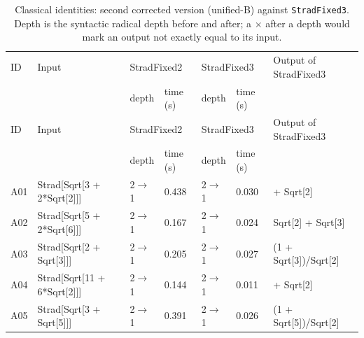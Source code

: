 \begin{longtable}{@{}p{}>{\ttfamily\footnotesize\raggedright\arraybackslash}p{}p{}p{}p{}p{}>{\ttfamily\footnotesize\raggedright\arraybackslash}p{}@{}}
\caption{Classical identities: second corrected version (unified-B) against \texttt{StradFixed3}. Depth is the syntactic radical depth before and after; a $\times$ after a depth would mark an output not exactly equal to its input.}\label{tab:cmpA}\\
\toprule ID & Input & \multicolumn{2}{l}{StradFixed2} & \multicolumn{2}{l}{StradFixed3} & Output of StradFixed3\\ & & depth & time (s) & depth & time (s) & \\\midrule\endfirsthead
\toprule ID & Input & \multicolumn{2}{l}{StradFixed2} & \multicolumn{2}{l}{StradFixed3} & Output of StradFixed3\\ & & depth & time (s) & depth & time (s) & \\\midrule\endhead
\bottomrule\endfoot
A01 & Strad[\allowbreak{}Sqrt[\allowbreak{}3 +\allowbreak{} 2*\allowbreak{}Sqrt[\allowbreak{}2]\allowbreak{}]\allowbreak{}]\allowbreak{} & 2$\to$1 & 0.438 & 2$\to$1 & 0.030 & 1 +\allowbreak{} Sqrt[\allowbreak{}2]\allowbreak{}\\
A02 & Strad[\allowbreak{}Sqrt[\allowbreak{}5 +\allowbreak{} 2*\allowbreak{}Sqrt[\allowbreak{}6]\allowbreak{}]\allowbreak{}]\allowbreak{} & 2$\to$1 & 0.167 & 2$\to$1 & 0.024 & Sqrt[\allowbreak{}2]\allowbreak{} +\allowbreak{} Sqrt[\allowbreak{}3]\allowbreak{}\\
A03 & Strad[\allowbreak{}Sqrt[\allowbreak{}2 +\allowbreak{} Sqrt[\allowbreak{}3]\allowbreak{}]\allowbreak{}]\allowbreak{} & 2$\to$1 & 0.205 & 2$\to$1 & 0.027 & (\allowbreak{}1 +\allowbreak{} Sqrt[\allowbreak{}3]\allowbreak{})\allowbreak{}/\allowbreak{}Sqrt[\allowbreak{}2]\allowbreak{}\\
A04 & Strad[\allowbreak{}Sqrt[\allowbreak{}11 +\allowbreak{} 6*\allowbreak{}Sqrt[\allowbreak{}2]\allowbreak{}]\allowbreak{}]\allowbreak{} & 2$\to$1 & 0.144 & 2$\to$1 & 0.011 & 3 +\allowbreak{} Sqrt[\allowbreak{}2]\allowbreak{}\\
A05 & Strad[\allowbreak{}Sqrt[\allowbreak{}3 +\allowbreak{} Sqrt[\allowbreak{}5]\allowbreak{}]\allowbreak{}]\allowbreak{} & 2$\to$1 & 0.391 & 2$\to$1 & 0.026 & (\allowbreak{}1 +\allowbreak{} Sqrt[\allowbreak{}5]\allowbreak{})\allowbreak{}/\allowbreak{}Sqrt[\allowbreak{}2]\allowbreak{}\\

\end{longtable}
